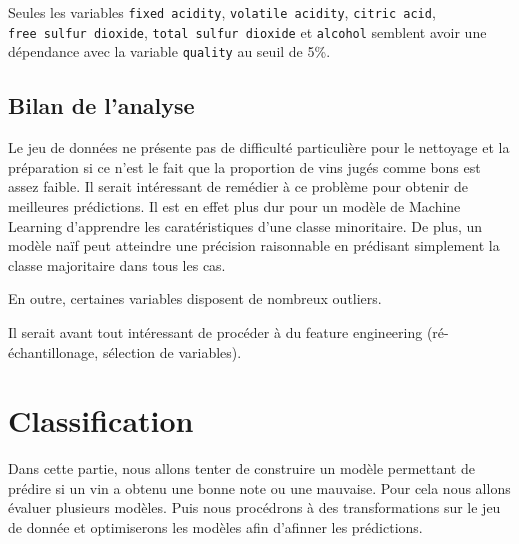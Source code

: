 \documentclass[11pt]{article}
\begin{document}
    Seules les variables \texttt{fixed\ acidity},
\texttt{volatile\ acidity}, \texttt{citric\ acid},
\texttt{free\ sulfur\ dioxide}, \texttt{total\ sulfur\ dioxide} et
\texttt{alcohol} semblent avoir une dépendance avec la variable
\texttt{quality} au seuil de 5\%.

    \hypertarget{bilan-de-lanalyse}{%
\subsection{Bilan de l'analyse}\label{bilan-de-lanalyse}}

Le jeu de données ne présente pas de difficulté particulière pour le
nettoyage et la préparation si ce n'est le fait que la proportion de
vins jugés comme bons est assez faible. Il serait intéressant de
remédier à ce problème pour obtenir de meilleures prédictions. Il est en
effet plus dur pour un modèle de Machine Learning d'apprendre les
caratéristiques d'une classe minoritaire. De plus, un modèle naïf peut
atteindre une précision raisonnable en prédisant simplement la classe
majoritaire dans tous les cas.

En outre, certaines variables disposent de nombreux outliers.

Il serait avant tout intéressant de procéder à du feature engineering
(ré-échantillonage, sélection de variables).

\hypertarget{classification}{%
\section{Classification}\label{classification}}

Dans cette partie, nous allons tenter de construire un modèle permettant
de prédire si un vin a obtenu une bonne note ou une mauvaise. Pour cela
nous allons évaluer plusieurs modèles. Puis nous procédrons à des
transformations sur le jeu de donnée et optimiserons les modèles afin
d'afinner les prédictions.
\end{document}
